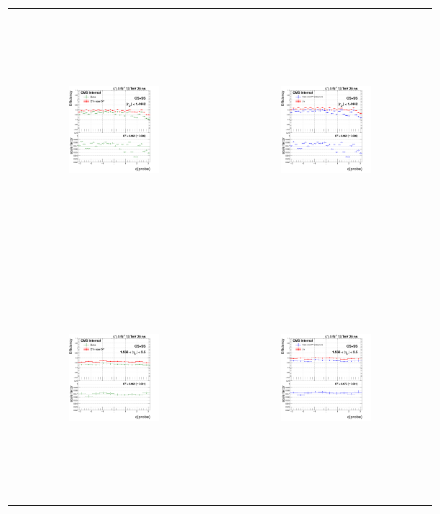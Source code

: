 \begin{figure}[htp]
  \begin{center}
    \begin{tabular}{cc}
      \includegraphics[width=0.45\textwidth,height=6.3cm]{figures/Zprime/2017/ScaleFactor/SameSign/nominal/g_compare_cut_phi_Barrel_ea_ta_inc_AS_nominal_PUW.png} &
      \includegraphics[width=0.45\textwidth,height=6.3cm]{figures/Zprime/2017/ScaleFactor/SameSign/nominal/g_compare_cut_phi_Barrel_ea_ta_exc_AS_nominal_PUW.png} \\
      \includegraphics[width=0.45\textwidth,height=6.3cm]{figures/Zprime/2017/ScaleFactor/SameSign/nominal/g_compare_cut_phi_Endcap_ea_ta_inc_AS_nominal_PUW.png} &
      \includegraphics[width=0.45\textwidth,height=6.3cm]{figures/Zprime/2017/ScaleFactor/SameSign/nominal/g_compare_cut_phi_Endcap_ea_ta_exc_AS_nominal_PUW.png}

\end{tabular}
\end{center}
\end{figure}
